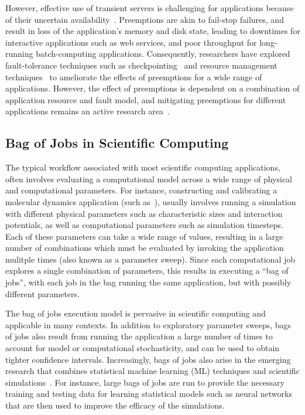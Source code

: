 However, effective use of transient servers is challenging for applications because of their uncertain availability~\cite{spotcheck, prateek-thesis}. 
Preemptions are akin to fail-stop failures, and result in loss of the application's memory and disk state, leading to downtimes for interactive applications such as web services, and poor throughput for long-running batch-computing applications. 
Consequently, researchers have explored fault-tolerance techniques such as checkpointing~\cite{flint, marathe2014exploiting, spoton} and resource management techniques~\cite{exosphere} to ameliorate the effects of preemptions for a wide range of applications. 
However, the effect of preemptions is dependent on a combination of application resource and fault model, and mitigating preemptions for different applications remains an active research area~\cite{hourglass-eurosys19}. 




\subsection{Bag of Jobs in Scientific Computing}

The typical workflow associated with most scientific computing applications, often involves evaluating a computational model across a wide range of physical and computational parameters. 
For instance, constructing and calibrating a molecular dynamics application (such as~\cite{jcs1}), usually involves running a simulation with different physical parameters such as characteristic sizes and interaction potentials, as well as computational parameters such as simulation timesteps. 
Each of these parameters can take a wide range of values, resulting in a large number of combinations which must be evaluated by invoking the application mulitple times (also known as a parameter sweep). 
Since each computational job explores a single combination of parameters, this results in executing a ``bag of jobs'', with each job in the bag running the same application, but with possibly different parameters. 


The bag of jobs execution model is pervasive in scientific computing and applicable in many contexts.
In addition to exploratory parameter sweeps, bags of jobs also result from running the application a large number of times to account for model or computational stochasticity, and can be used to obtain tighter confidence intervals. 
Increasingly, bags of jobs also arise in the emerging research that combines statistical machine learning (ML) techniques and scientific simulations~\cite{ml.atomic2017,melko2017,sam2017,fu2017,long2015machine, ferguson2017machine,ward2018matminer,jcs1,jcs2,fox2019learning}.
For instance, large bags of jobs are run to provide the necessary training and testing data for learning statistical models such as neural networks that are then used to improve the efficacy of the simulations. 

